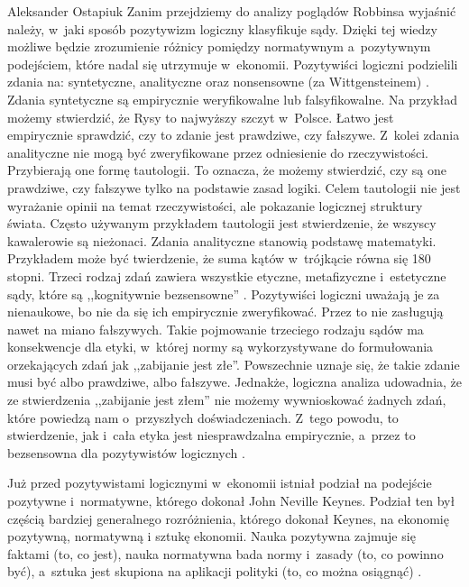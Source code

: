 \begin{artplenv}{Aleksander Ostapiuk}
Zanim przejdziemy do analizy poglądów Robbinsa wyjaśnić należy, w~jaki sposób pozytywizm logiczny klasyfikuje sądy.
Dzięki tej wiedzy możliwe będzie zrozumienie różnicy pomiędzy normatywnym a~pozytywnym podejściem, które nadal się
utrzymuje w~ekonomii. Pozytywiści logiczni podzielili zdania na: syntetyczne, analityczne oraz nonsensowne (za Wittgensteinem)
\parencite[s.~10 i~18]{putnam_collapse_2002}.
Zdania syntetyczne są empirycznie
weryfikowalne lub falsyfikowalne. Na przykład możemy stwierdzić, że Rysy to najwyższy szczyt w~Polsce. Łatwo jest
empirycznie sprawdzić, czy to zdanie jest prawdziwe, czy fałszywe. Z~kolei zdania analityczne nie mogą być zweryfikowane
przez odniesienie do rzeczywistości. Przybierają one formę tautologii. To oznacza, że możemy stwierdzić, czy są one
prawdziwe, czy fałszywe tylko na podstawie zasad logiki. Celem tautologii nie jest wyrażanie opinii na temat
rzeczywistości, ale pokazanie logicznej struktury świata. Często używanym przykładem tautologii jest stwierdzenie, że
wszyscy kawalerowie są nieżonaci. Zdania analityczne stanowią podstawę matematyki. Przykładem może być twierdzenie, że
suma kątów w~trójkącie równa się 180 stopni. Trzeci rodzaj zdań zawiera wszystkie etyczne, metafizyczne i~estetyczne
sądy, które są ,,kognitywnie bezsensowne''
\parencite[s.~10]{putnam_collapse_2002}.
Pozytywiści logiczni uważają
je za nienaukowe, bo nie da się ich empirycznie zweryfikować. Przez to nie zasługują nawet na miano fałszywych. Takie
pojmowanie trzeciego rodzaju sądów ma konsekwencje dla etyki, w~której normy są wykorzystywane do formułowania
orzekających zdań jak ,,zabijanie jest złe''. Powszechnie uznaje się, że takie zdanie musi być albo prawdziwe, albo
fałszywe. Jednakże, logiczna analiza udowadnia, że ze stwierdzenia ,,zabijanie jest złem'' nie możemy wywnioskować żadnych
zdań, które powiedzą nam o~przyszłych doświadczeniach. Z~tego powodu, to stwierdzenie, jak i~cała etyka jest
niesprawdzalna empirycznie, a~przez to bezsensowna dla pozytywistów logicznych
\parencite[s.~25]{carnap_philosophy_1935}.

Już przed pozytywistami logicznymi w~ekonomii istniał podział na podejście pozytywne i~normatywne, którego dokonał John
Neville Keynes. Podział ten był częścią bardziej generalnego rozróżnienia,
którego dokonał Keynes, na ekonomię pozytywną, normatywną i sztukę ekonomii.
Nauka pozytywna zajmuje się faktami (to, co jest), nauka normatywna bada
normy i~zasady (to, co powinno być), a~sztuka jest skupiona na aplikacji polityki (to, co można osiągnąć)
\parencite[s.~34–35]{keynes_scope_1917}.


\end{artplenv}

